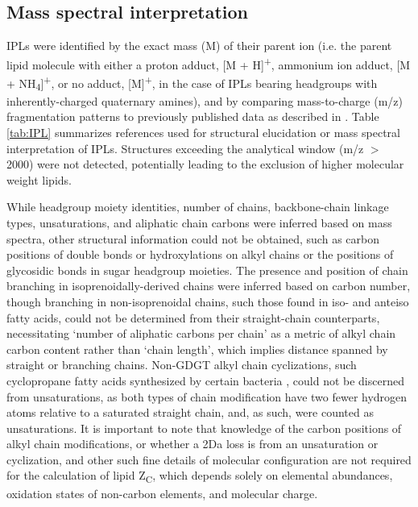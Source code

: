 \subsection{Mass spectral interpretation} IPLs were identified by the exact mass (M) of their parent ion (i.e. the parent lipid molecule with either a proton adduct, [M + H]\textsuperscript{+}, ammonium ion adduct, [M + NH\textsubscript{4}]\textsuperscript{+}, or no adduct, [M]\textsuperscript{+}, in the case of IPLs bearing headgroups with inherently-charged quaternary amines), and by comparing mass-to-charge (m/z) fragmentation patterns to previously published data as described in \cite{Sturt_Intact_2004}. Table \ref{tab:IPL} summarizes references used for structural elucidation or mass spectral interpretation of IPLs. Structures exceeding the analytical window (m/z $>$ 2000) were not detected, potentially leading to the exclusion of higher molecular weight lipids.

While headgroup moiety identities, number of chains, backbone-chain linkage types, unsaturations, and aliphatic chain carbons were inferred based on mass spectra, other structural information could not be obtained, such as carbon positions of double bonds or hydroxylations on alkyl chains or the positions of glycosidic bonds in sugar headgroup moieties. The presence and position of chain branching in isoprenoidally-derived chains were inferred based on carbon number, though branching in non-isoprenoidal chains, such those found in iso- and anteiso fatty acids, could not be determined from their straight-chain counterparts, necessitating `number of aliphatic carbons per chain' as a metric of alkyl chain carbon content rather than `chain length', which implies distance spanned by straight or branching chains. Non-GDGT alkyl chain cyclizations, such cyclopropane fatty acids synthesized by certain bacteria \citep{grogan1997cyclopropane}, could not be discerned from unsaturations, as both types of chain modification have two fewer hydrogen atoms relative to a saturated straight chain, and, as such, were counted as unsaturations. It is important to note that knowledge of the carbon positions of alkyl chain modifications, or whether a 2Da loss is from an unsaturation or cyclization, and other such fine details of molecular configuration are not required for the calculation of lipid Z\textsubscript{C}, which depends solely on elemental abundances, oxidation states of non-carbon elements, and molecular charge.

